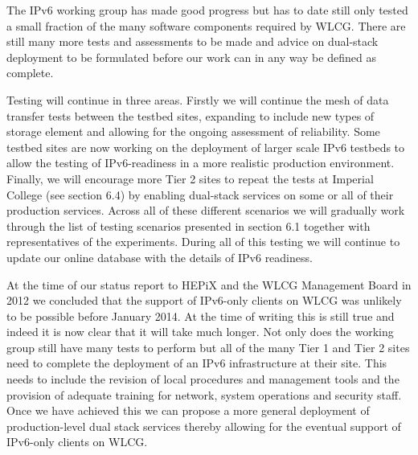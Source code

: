 The IPv6 working group has made good progress but has to date still only tested a small fraction of the many 
software components required by WLCG. There are still many more tests and 
assessments to be made and advice on dual-stack deployment to be formulated before 
our work can in any way be defined as complete.

Testing will continue in three areas. Firstly we will continue the mesh of data transfer tests between
the testbed sites, expanding to include new types of storage element and allowing for the ongoing
assessment of reliability. Some testbed sites are now working on the deployment of larger scale IPv6 testbeds
to allow the testing of IPv6-readiness in a more realistic production environment. Finally, we will encourage 
more Tier 2 sites to repeat the
tests at Imperial College (see section 6.4) by enabling dual-stack services on some or all of their production
services. Across all of these different scenarios we will gradually work through the list of testing scenarios presented
in section 6.1 together with representatives of the experiments.  During all of this testing we
will continue to update our online database with the details of IPv6 readiness.

At the time of our status report to HEPiX and the WLCG Management Board in 2012 we concluded that
the support of IPv6-only clients on WLCG was unlikely to be possible before January 2014. At the time of writing this is still true and indeed it is now clear that it will take much longer. Not only does the working group still have many tests to perform
but all of the many Tier 1 and Tier 2 sites need to complete the deployment of an IPv6 infrastructure at their site. This needs to include
the revision of local procedures and management tools and the provision of adequate training for network,
system operations and security staff. Once we have achieved this we can propose a more general deployment of 
production-level dual stack services thereby allowing for the eventual support of IPv6-only clients on WLCG.
